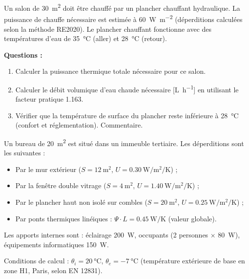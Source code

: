 

Un salon de \SI{30}{\meter\squared} doit être chauffé par un plancher chauffant hydraulique.
La puissance de chauffe nécessaire est estimée à \SI{60}{\watt\per\meter\squared} (déperditions
calculées selon la méthode RE2020). Le plancher chauffant fonctionne avec des températures
d'eau de \SI{35}{\degreeCelsius} (aller) et \SI{28}{\degreeCelsius} (retour).

\textbf{Questions :}
\begin{enumerate}
  \item Calculer la puissance thermique totale nécessaire pour ce salon.
  \item Calculer le débit volumique d'eau chaude nécessaire [\si{\liter\per\hour}] en
        utilisant le facteur pratique \num{1,163}.
  \item Vérifier que la température de surface du plancher reste inférieure à
        \SI{28}{\degreeCelsius} (confort et réglementation). Commentaire.
\end{enumerate}



Un bureau de \SI{20}{\meter\squared} est situé dans un immeuble tertiaire. Les déperditions
sont les suivantes :
\begin{itemize}
  \item Par le mur extérieur (\(S = \SI{12}{\meter\squared}\), \(U = \SI{0,30}{\watt\per\meter\squared\per\kelvin}\)) ;
  \item Par la fenêtre double vitrage (\(S = \SI{4}{\meter\squared}\), \(U = \SI{1,40}{\watt\per\meter\squared\per\kelvin}\)) ;
  \item Par le plancher haut non isolé sur combles (\(S = \SI{20}{\meter\squared}\), \(U = \SI{0,25}{\watt\per\meter\squared\per\kelvin}\)) ;
  \item Par ponts thermiques linéiques : \(\Psi \cdot L = \SI{0,45}{\watt\per\kelvin}\) (valeur globale).
\end{itemize}

Les apports internes sont : éclairage \SI{200}{\watt}, occupants (2 personnes × \SI{80}{\watt}),
équipements informatiques \SI{150}{\watt}.

Conditions de calcul : \(\theta_i = \SI{20}{\degreeCelsius}\), \(\theta_e = \SI{-7}{\degreeCelsius}\)
(température extérieure de base en zone H1, Paris, selon EN 12831).

